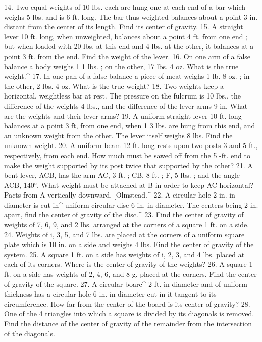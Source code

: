 14. Two equal weights of 10 lbs. each are hung one at each end of a bar which weighs 5 lbs. and is 6 ft. long. The bar thus weighted balances about a point 3 in. distant from the center of its length. Find its center of gravity.
15. A straight lever 10 ft. long, when unweighted, balances about a point 4 ft. from one end ; but when loaded with 20 lbs. at this end and 4 lbs. at the other, it balances at a point 3 ft. from the end. Find the weight of the lever.
16. On one arm of a false balance a body weighs 1 1 lbs. ; on the other, 17 lbs. 4 oz. What is the true weight.^
17. In one pan of a false balance a piece of meat weighs 1 lb. 8 oz. ; in the other, 2 lbs. 4 oz. What is the true weight?
18. Two weights keep a horizontal, weightless bar at rest. The pressure on the fulcrum is 10 lbs., the difference of the weights 4 lbs., and the difference of the lever arms 9 in. What are the weights and their lever arms?
19. A uniform straight lever 10 ft. long balances at a point 3 ft, from one end, when 1 3 lbs. are hung from this end, and an unknown weight from the other. The lever itself weighs 8 lbs. Find the unknown weight.
20. A uniform beam 12 ft. long rests upon two posts 3 and 5 ft., respectively, from each end. How much must be sawed off from the 5 -ft. end to make the weight supported by its post twice that supported by the other?
21. A bent lever, ACB, has the arm AC, 3 ft. ; CB, 8 ft. ; F, 5 lbs. ; and the angle ACB, 140°. What weight must be attached at B in order to keep AC horizontal? -Pacts from A vertically downward. [Olmstead.^
22. A circular hole 2 in. in diameter is cut in^ uniform circular disc 6 in. in diameter. The centers being 2 in. apart, find the center of gravity of the disc.^
23. Find the center of gravity of weights of 7, 6, 9, and 2 lbs. arranged at the corners of a square 1 ft. on a side.
24. Weights of i, 3, 5, and 7 lbs. are placed at the corners of a uniform square plate which is 10 in. on a side and weighs 4 lbs. Find the center of gravity of the system.
25. A square 1 ft. on a side has weights of i, 2, 3, and 4 lbs. placed at each of its corners. Where is the center of gravity of the weights?
26. A square 1 ft. on a side has weights of 2, 4, 6, and 8 g. placed at the corners. Find the center of gravity of the square.
27. A circular boarc^ 2 ft. in diameter and of uniform thickness has a circular hole 6 in. in diameter cut in it tangent to its circumference. How far from the center of the board is its center of gravity?
28. One of the 4 triangles into which a square is divided by its diagonals is removed. Find the distance of the center of gravity of the remainder from the intersection of the diagonals.
